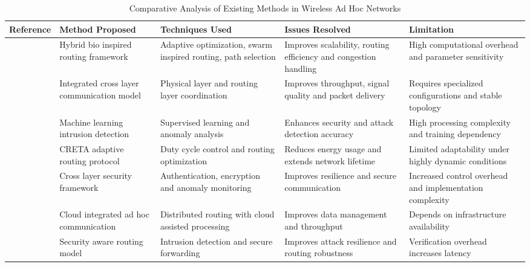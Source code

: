 \documentclass[a4paper,fleqn,final,1p]{cas-dc}
\numberwithin{equation}{section}
\begin{document}
\begin{table}[t]
\centering
\caption{Comparative Analysis of Existing Methods in Wireless Ad Hoc Networks}
\label{tab:literature}
\scriptsize
\renewcommand{\arraystretch}{1.7}
\renewcommand{\arraystretch}{1.55}
\setlength{\tabcolsep}{4pt}

\begin{tabularx}{\textwidth}{|c|X|X|X|X|}
\hline
\textbf{Reference} &
\textbf{Method Proposed} &
\textbf{Techniques Used} &
\textbf{Issues Resolved} &
\textbf{Limitation} \\
\hline

\cite{SanthoshKumar2025280}
&
Hybrid bio inspired routing framework
&
Adaptive optimization, swarm inspired routing, path selection
&
Improves scalability, routing efficiency and congestion handling
&
High computational overhead and parameter sensitivity
\\
\hline

\cite{Rasulov2025116}
&
Integrated cross layer communication model
&
Physical layer and routing layer coordination
&
Improves throughput, signal quality and packet delivery
&
Requires specialized configurations and stable topology
\\
\hline

\cite{Aluri2025707}
&
Machine learning intrusion detection
&
Supervised learning and anomaly analysis
&
Enhances security and attack detection accuracy
&
High processing complexity and training dependency
\\
\hline

\cite{Vastrad2025372}
&
CRETA adaptive routing protocol
&
Duty cycle control and routing optimization
&
Reduces energy usage and extends network lifetime
&
Limited adaptability under highly dynamic conditions
\\
\hline

\cite{Ghourab20252011}
&
Cross layer security framework
&
Authentication, encryption and anomaly monitoring
&
Improves resilience and secure communication
&
Increased control overhead and implementation complexity
\\
\hline

\cite{Ahmed20252157}
&
Cloud integrated ad hoc communication
&
Distributed routing with cloud assisted processing
&
Improves data management and throughput
&
Depends on infrastructure availability
\\
\hline

\cite{mashhadani2025security}
&
Security aware routing model
&
Intrusion detection and secure forwarding
&
Improves attack resilience and routing robustness
&
Verification overhead increases latency
\\
\hline


\end{tabularx}
\end{table}
\end{document}
